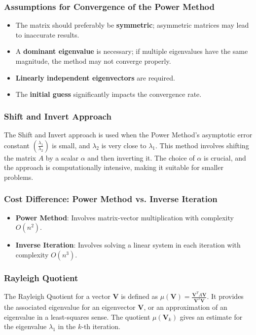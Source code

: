 \documentclass[unicode,11pt,a4paper,oneside,numbers=endperiod,openany]{scrartcl}
\begin{document}
\subsubsection{Assumptions for Convergence of the Power Method}
\begin{itemize}
    \item The matrix should preferably be \textbf{symmetric}; asymmetric matrices may lead to inaccurate results.
    \item A \textbf{dominant eigenvalue} is necessary; if multiple eigenvalues have the same magnitude, the method may not converge properly.
    \item \textbf{Linearly independent eigenvectors} are required.
    \item The \textbf{initial guess} significantly impacts the convergence rate.
\end{itemize}

\subsubsection{Shift and Invert Approach}
The Shift and Invert approach is used when the Power Method's asymptotic error constant \( \left(\frac{\lambda_1}{\lambda_2}\right) \) is small, and \( \lambda_2 \) is very close to \( \lambda_1 \). This method involves shifting the matrix \( A \) by a scalar \( \alpha \) and then inverting it. The choice of \( \alpha \) is crucial, and the approach is computationally intensive, making it suitable for smaller problems.

\subsubsection{Cost Difference: Power Method vs. Inverse Iteration}
\begin{itemize}
    \item \textbf{Power Method}: Involves matrix-vector multiplication with complexity \( O(n^2) \).
    \item \textbf{Inverse Iteration}: Involves solving a linear system in each iteration with complexity \( O(n^3) \).
\end{itemize}

\subsubsection{Rayleigh Quotient}
The Rayleigh Quotient for a vector \( \mathbf{V} \) is defined as \( \mu(\mathbf{V}) = \frac{\mathbf{V}^T A \mathbf{V}}{\mathbf{V}^T \mathbf{V}} \). It provides the associated eigenvalue for an eigenvector \( \mathbf{V} \), or an approximation of an eigenvalue in a least-squares sense. The quotient \( \mu(\mathbf{V}_k) \) gives an estimate for the eigenvalue \( \lambda_1 \) in the \( k \)-th iteration.
\end{document}
